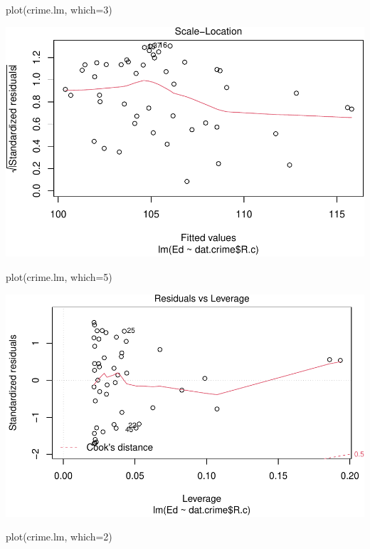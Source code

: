 \documentclass[
]{article}
\newenvironment{Shaded}{\begin{snugshade}}{\end{snugshade}}
\newcommand{\AttributeTok}[1]{\textcolor[rgb]{0.77,0.63,0.00}{#1}}
\newcommand{\DecValTok}[1]{\textcolor[rgb]{0.00,0.00,0.81}{#1}}
\newcommand{\FunctionTok}[1]{\textcolor[rgb]{0.00,0.00,0.00}{#1}}
\newcommand{\NormalTok}[1]{#1}
\begin{document}
\begin{Shaded}
\begin{Highlighting}[]
\FunctionTok{plot}\NormalTok{(crime.lm, }\AttributeTok{which=}\DecValTok{3}\NormalTok{)}
\end{Highlighting}
\end{Shaded}

\includegraphics{Journal_files/figure-latex/unnamed-chunk-38-3.pdf}

\begin{Shaded}
\begin{Highlighting}[]
\FunctionTok{plot}\NormalTok{(crime.lm, }\AttributeTok{which=}\DecValTok{5}\NormalTok{)}
\end{Highlighting}
\end{Shaded}

\includegraphics{Journal_files/figure-latex/unnamed-chunk-38-4.pdf}

\begin{Shaded}
\begin{Highlighting}[]
\FunctionTok{plot}\NormalTok{(crime.lm, }\AttributeTok{which=}\DecValTok{2}\NormalTok{)}
\end{Highlighting}
\end{Shaded}
\end{document}
